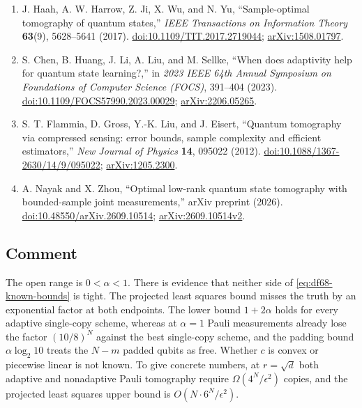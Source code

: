 \begin{enumerate}[label={},leftmargin=4.8em,labelsep=0.5em]
  \item[\textup{[HHJ+17]}]\label{ref:df68-haah}
  J. Haah, A. W. Harrow, Z. Ji, X. Wu, and N. Yu, ``Sample-optimal tomography of quantum states,'' \emph{IEEE Transactions on Information Theory} \textbf{63}(9), 5628--5641 (2017).
\href{https://doi.org/10.1109/TIT.2017.2719044}{doi:10.1109/TIT.2017.2719044};
\href{https://arxiv.org/abs/1508.01797}{arXiv:1508.01797}.

  \item[\textup{[CHL+23]}]\label{ref:df68-chen}
  S. Chen, B. Huang, J. Li, A. Liu, and M. Sellke, ``When does adaptivity help for quantum state learning?,'' in \emph{2023 IEEE 64th Annual Symposium on Foundations of Computer Science (FOCS)}, 391--404 (2023).
\href{https://doi.org/10.1109/FOCS57990.2023.00029}{doi:10.1109/FOCS57990.2023.00029};
\href{https://arxiv.org/abs/2206.05265}{arXiv:2206.05265}.

  \item[\textup{[FGLE12]}]\label{ref:df68-flammia}
  S. T. Flammia, D. Gross, Y.-K. Liu, and J. Eisert, ``Quantum tomography via compressed sensing: error bounds, sample complexity and efficient estimators,'' \emph{New Journal of Physics} \textbf{14}, 095022 (2012).
\href{https://doi.org/10.1088/1367-2630/14/9/095022}{doi:10.1088/1367-2630/14/9/095022};
\href{https://arxiv.org/abs/1205.2300}{arXiv:1205.2300}.

  \item[\textup{[NZ26]}]\label{ref:df68-nayak-zhou}
  A. Nayak and X. Zhou, ``Optimal low-rank quantum state tomography with bounded-sample joint measurements,'' arXiv preprint (2026).
\href{https://doi.org/10.48550/arXiv.2609.10514}{doi:10.48550/arXiv.2609.10514};
\href{https://arxiv.org/abs/2609.10514v2}{arXiv:2609.10514v2}.
\end{enumerate}

\subsection*{Comment}

The open range is $0<\alpha<1$. There is evidence that neither side of \eqref{eq:df68-known-bounds} is tight. The projected least squares bound misses the truth by an exponential factor at both endpoints. The lower bound $1+2\alpha$ holds for every adaptive single-copy scheme, whereas at $\alpha=1$ Pauli measurements already lose the factor $(10/8)^N$ against the best single-copy scheme, and the padding bound $\alpha\log_2 10$ treats the $N-m$ padded qubits as free. Whether $c$ is convex or piecewise linear is not known. To give concrete numbers, at $r=\sqrt d$ both adaptive and nonadaptive Pauli tomography require $\Omega(4^N/\epsilon^2)$ copies, and the projected least squares upper bound is $O(N\cdot 6^N/\epsilon^2)$.

